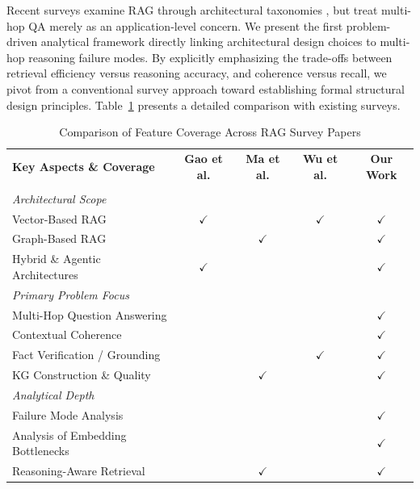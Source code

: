 \documentclass[runningheads]{llncs}
\begin{document}
Recent surveys examine RAG through architectural taxonomies \cite{3,4,5}, but treat multi-hop QA merely as an application-level concern. We present the first problem-driven analytical framework directly linking architectural design choices to multi-hop reasoning failure modes. By explicitly emphasizing the trade-offs between retrieval efficiency versus reasoning accuracy, and coherence versus recall, we pivot from a conventional survey approach toward establishing formal structural design principles. Table~\ref{tab:survey_comparison} presents a detailed comparison with existing surveys.

\begin{table}[htbp]
\centering
\caption{Comparison of Feature Coverage Across RAG Survey Papers}
\label{tab:survey_comparison}
\setlength{\tabcolsep}{10pt}
\begin{tabular}{@{}lcccc@{}}
\toprule
\textbf{Key Aspects \& Coverage} & \textbf{Gao et al.} & \textbf{Ma et al.} & \textbf{Wu et al.} & \textbf{Our Work} \\
 & \cite{3} & \cite{4} & \cite{5} & \\ 
\midrule
\multicolumn{5}{l}{\textit{Architectural Scope}} \\
\quad Vector-Based RAG & $\checkmark$ & & $\checkmark$ & $\checkmark$ \\
\quad Graph-Based RAG & & $\checkmark$ & & $\checkmark$ \\
\quad Hybrid \& Agentic Architectures & $\checkmark$ & & & $\checkmark$ \\
\midrule
\multicolumn{5}{l}{\textit{Primary Problem Focus}} \\ 
\quad Multi-Hop Question Answering & & & & $\checkmark$ \\
\quad Contextual Coherence & & & & $\checkmark$ \\
\quad Fact Verification / Grounding & & & $\checkmark$ & $\checkmark$ \\
\quad KG Construction \& Quality & & $\checkmark$ & & $\checkmark$ \\
\midrule
\multicolumn{5}{l}{\textit{Analytical Depth}} \\
\quad Failure Mode Analysis & & & & $\checkmark$ \\
\quad Analysis of Embedding Bottlenecks & & & & $\checkmark$ \\ 
\quad Reasoning-Aware Retrieval & & $\checkmark$ & & $\checkmark$ \\
\bottomrule
\end{tabular}
\end{table}
\end{document}
